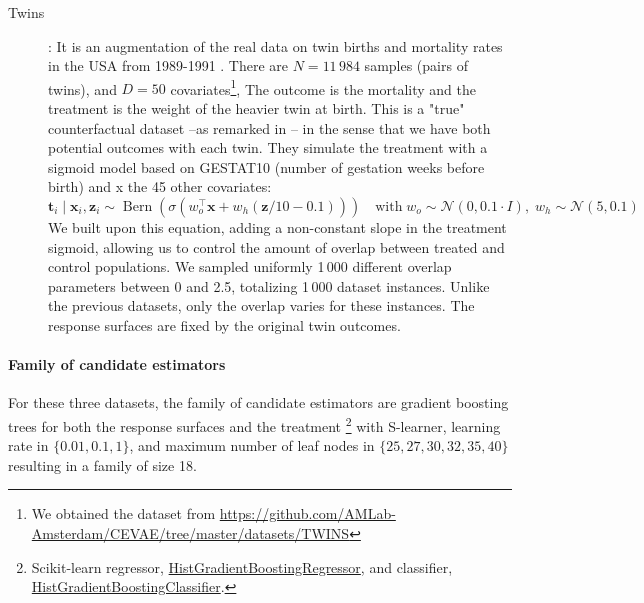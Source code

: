 \documentclass[10pt]{article}
\begin{document}
\begin{multicols}{2}
\begin{description}
        \item[Twins] \cite{louizos_causal_2017}: It is an augmentation of the
            real data on twin births and mortality rates in the USA from 1989-1991
            \cite{almond_costs_2005}. There are $N=11\,984$ samples (pairs of twins),
            and $D=50$ covariates\footnote{We obtained the dataset from
                \href{https://github.com/AMLab-Amsterdam/CEVAE/tree/master/datasets/TWINS}{https://github.com/AMLab-Amsterdam/CEVAE/tree/master/datasets/TWINS}}, The outcome is the mortality and the treatment is the
            weight of the heavier twin at birth. This is a "true" counterfactual dataset
            --as remarked in \cite{curth_really_2021}-- in the sense that we have
            both potential outcomes with each twin. They simulate the treatment with a
            sigmoid model based on GESTAT10 (number of gestation weeks before birth) and x
            the 45 other covariates:
            \begin{equation}
                \mathbf{t}_{i} \mid \mathbf{x}_{i}, \mathbf{z}_{i} \sim
                \operatorname{Bern}\left(\sigma\left(w_{o}^{\top}
                \mathbf{x}+w_{h}(\mathbf{z} / 10-0.1)\right)\right) \quad \text{with} \;
                w_{o} \sim \mathcal{N}(0,0.1 \cdot I),\; w_{h} \sim \mathcal{N}(5,0.1)
            \end{equation}
            We built upon this equation, adding a non-constant slope in the
            treatment sigmoid, allowing us to control the amount of overlap between
            treated and control populations.
            We sampled uniformly 1\,000 different overlap parameters between 0 and
            2.5, totalizing 1\,000 dataset instances. Unlike the previous datasets,
            only the overlap varies for these instances. The response surfaces are
            fixed by the original twin outcomes.
    \end{description}

    \paragraph{Family of candidate
        estimators}\label{semi_simulated:candidate_estimators}

    For these three datasets, the family of candidate estimators are gradient
    boosting trees for both the response surfaces and the treatment
    \footnote{Scikit-learn regressor,
        \href{https://scikit-learn.org/stable/modules/generated/sklearn.ensemble.HistGradientBoostingRegressor.html}{HistGradientBoostingRegressor},
        and classifier,
        \href{https://scikit-learn.org/stable/modules/generated/sklearn.ensemble.HistGradientBoostingClassifier.html}{HistGradientBoostingClassifier}.}
    with S-learner, learning rate
    in $\{0.01, 0.1, 1\}$, and maximum number of leaf nodes in $\{25, 27, 30, 32,
        35, 40\}$ resulting in a family of size 18.


\end{multicols}
\end{document}
